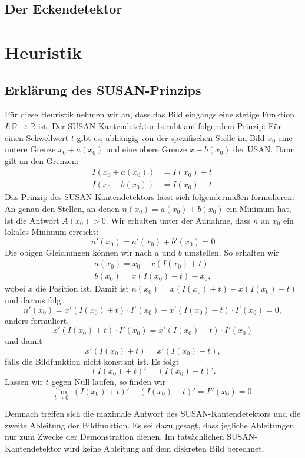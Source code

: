\documentclass[a4paper, 11pt]{report}
\theoremstyle{definition}
\begin{document}
			\subsection{Der Eckendetektor}
			

		\section{Heuristik}
			\subsection{Erklärung des SUSAN-Prinzips}
				Für diese Heuristik nehmen wir an, dass das Bild eingangs eine stetige Funktion $I: \mathbb{R}\to \mathbb{R}$ ist.
				Der SUSAN-Kantendetektor beruht auf folgendem Prinzip: Für einen Schwellwert $t$ gibt es, abhängig von der spezifischen Stelle im Bild $x_0$ eine untere Grenze $x_0+a(x_0)$ und eine obere Grenze $x-b(x_0)$ der USAN.
				Dann gilt an den Grenzen:
				\begin{align*}
					I(x_0 + a(x_0)) &= I(x_0) + t \\
					I(x_0 - b(x_0)) &= I(x_0) - t.
				\end{align*}
				Das Prinzip des SUSAN-Kantendetektors lässt sich folgendermaßen formulieren: An genau den Stellen, an denen $n(x_0) = a(x_0) + b(x_0)$ ein Minimum hat, ist die Antwort $A(x_0) > 0$. Wir erhalten unter der Annahme, dass $n$ an $x_0$ ein lokales Minimum erreicht:
				$$ n'(x_0) = a'(x_0) + b'(x_0) = 0 $$
				Die obigen Gleichungen können wir nach $a$ und $b$ umstellen. So erhalten wir
				\begin{align*}
					a(x_0) = x_0 - x(I(x_0) + t) \\
					b(x_0) = x(I(x_0) - t) - x_0,
				\end{align*}
				wobei $x$ die Position ist.
				Damit ist $n(x_0) = x(I(x_0) + t) - x(I(x_0) - t)$ und daraus folgt
				$$ n'(x_0) = x'(I(x_0) + t) \cdot I'(x_0) - x'(I(x_0) - t) \cdot I'(x_0) = 0,$$
				anders formuliert,
				$$ x'(I(x_0) + t) \cdot I'(x_0) = x'(I(x_0) - t) \cdot I'(x_0) $$
				und damit $$x'(I(x_0) + t) = x'(I(x_0) - t),$$
				falls die Bildfunktion nicht konstant ist.
	 			Es folgt 
	 			$$(I(x_0) + t)' = (I(x_0) - t)'.$$
	 			Lassen wir $t$ gegen Null laufen, so finden wir
	 			$$\lim_{t\to 0}\; (I(x_0) + t)' - (I(x_0) - t)' = I''(x_0) = 0. $$

	 			Demnach treffen sich die maximale Antwort des SUSAN-Kantendetektors und die zweite Ableitung der Bildfunktion. Es sei dazu gesagt, dass jegliche Ableitungen nur zum Zwecke der Demonstration dienen. Im tatsächlichen SUSAN-Kantendetektor wird keine Ableitung auf dem diskreten Bild berechnet.
\end{document}
